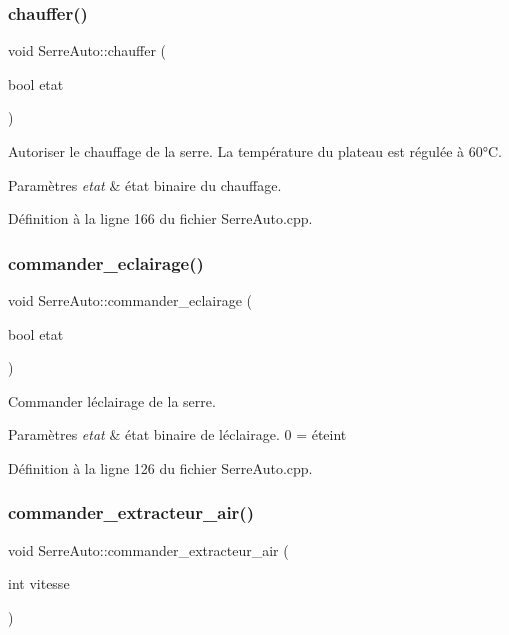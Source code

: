\subsubsection{chauffer()}
{\footnotesize\ttfamily void Serre\+Auto\+::chauffer (\begin{DoxyParamCaption}\item[{bool}]{etat }\end{DoxyParamCaption})}



Autoriser le chauffage de la serre. La température du plateau est régulée à 60°C. 


\begin{DoxyParams}{Paramètres}
{\em etat} & état binaire du chauffage. \\
\hline
\end{DoxyParams}


Définition à la ligne 166 du fichier Serre\+Auto.\+cpp.

\mbox{\label{class_serre_auto_aaa65776a78978fd8e197f972a7956082}} 
\subsubsection{commander\+\_\+eclairage()}
{\footnotesize\ttfamily void Serre\+Auto\+::commander\+\_\+eclairage (\begin{DoxyParamCaption}\item[{bool}]{etat }\end{DoxyParamCaption})}



Commander l\textquotesingle{}éclairage de la serre. 


\begin{DoxyParams}{Paramètres}
{\em etat} & état binaire de l\textquotesingle{}éclairage. 0 = éteint \\
\hline
\end{DoxyParams}


Définition à la ligne 126 du fichier Serre\+Auto.\+cpp.

\mbox{\label{class_serre_auto_a446f2846fb43184eb79a1127a3bb67a7}} 
\subsubsection{commander\+\_\+extracteur\+\_\+air()}
{\footnotesize\ttfamily void Serre\+Auto\+::commander\+\_\+extracteur\+\_\+air (\begin{DoxyParamCaption}\item[{int}]{vitesse }\end{DoxyParamCaption})}



